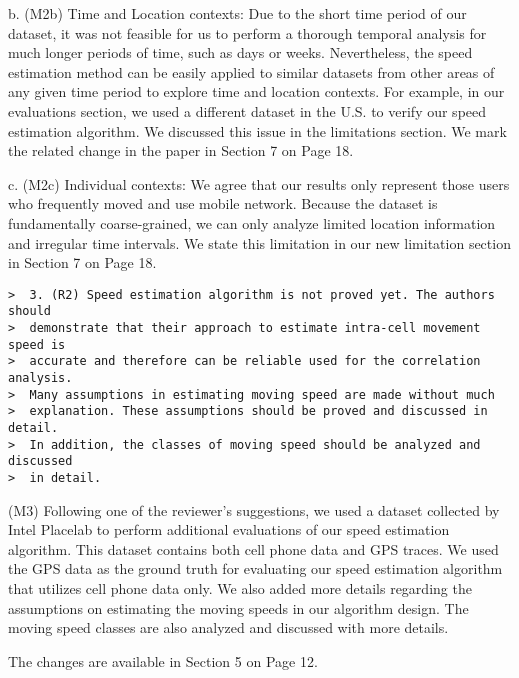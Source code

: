 b. (M2b) Time and Location contexts:
Due to the short time period of our dataset, it was not feasible for us to perform a thorough temporal %
analysis for much longer periods of time, such as days or weeks. 
Nevertheless, the speed estimation method can be easily applied to similar datasets from other areas of any given time period to explore time and location contexts. 
For example, in our evaluations section, we used a different dataset in the U.S. to verify our speed estimation algorithm. We discussed this issue in the limitations section. 
We mark the related change in the paper in Section 7 on Page 18.

c. (M2c) Individual contexts:
We agree that our results only represent those users who frequently moved and use mobile network. Because the dataset is fundamentally coarse-grained, we can only analyze limited location information and irregular time intervals. We state this limitation in our new limitation section in Section 7 on Page 18.  

\begin{verbatim}
>  3. (R2) Speed estimation algorithm is not proved yet. The authors should
>  demonstrate that their approach to estimate intra-cell movement speed is
>  accurate and therefore can be reliable used for the correlation analysis.
>  Many assumptions in estimating moving speed are made without much
>  explanation. These assumptions should be proved and discussed in detail.
>  In addition, the classes of moving speed should be analyzed and discussed
>  in detail.
\end{verbatim}

(M3) Following one of the reviewer's suggestions, we used a dataset collected by Intel Placelab %
to perform additional evaluations of our speed estimation algorithm. This dataset contains both cell phone data and GPS traces. We used the GPS data as the ground truth for  evaluating our speed estimation algorithm that utilizes cell phone data only. We also added more details regarding the assumptions on estimating the moving speeds in our algorithm design. The moving speed classes are also analyzed and discussed with more details. 

The changes are available in Section 5 on Page 12. 
 

